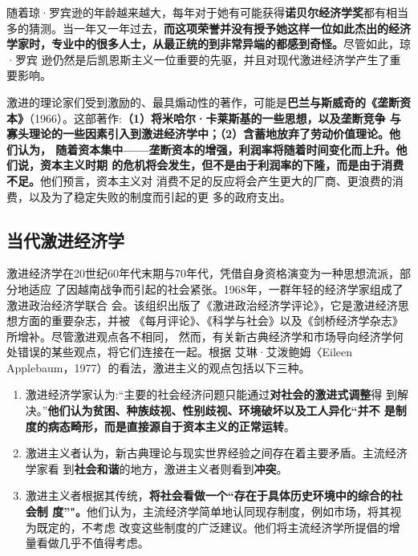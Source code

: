 随着琼·罗宾逊的年龄越来越大，每年对于她有可能获得\textbf{诺贝尔经济学奖}都有相当
多的猜测。当一年又一年过去，\textbf{而这项荣誉并没有授予她这样一位如此杰出的经济
  学家时，专业中的很多人士，从最正统的到非常异端的都感到奇怪。}尽管如此，琼·罗宾
逊仍然是后凯恩斯主义一位重要的先驱，并且对现代激进经济学产生了重要影响。

激进的理论家们受到激励的、最具煽动性的著作，可能是\textbf{巴兰与斯威奇的《垄断资
  本》}（1966）。这部著作:\textbf{（1）将米哈尔·卡莱斯基的一些思想，以及垄断竞争
  与寡头理论的一些因素引入到激进经济学中；（2）含蓄地放弃了劳动价值理论。他们认为，
  随着资本集中——垄断资本的增强，利润率将随着时间变化而上升。他们说，资本主义时期
  的危机将会发生，但不是由于利润率的下隆，而是由于消费不足。}他们预言，资本主义对
消费不足的反应将会产生更大的厂商、更浪费的消费，以及为了稳定失败的制度而引起的更
多的政府支出。

\subsection{当代激进经济学}

激进经济学在20世纪60年代末期与70年代，凭借自身资格演变为一种思想流派，部分地适应
了因越南战争而引起的社会紧张。1968年，一群年轻的经济学家组成了激进政治经济学联合
会。该组织出版了《激进政治经济学评论》，它是激进经济思想方面的重要杂志，并被
《每月评论》、《科学与社会》以及《剑桥经济学杂志》所增补。尽管激进观点各不相同，
然而，有关新古典经济学和市场导向经济学何处错误的某些观点，将它们连接在一起。根据
艾琳·艾泼鲍姆〈Eileen Applebaum，1977）的看法，激进主义的观点包括以下三种。

\begin{enumerate}[（1）]
\item 激进经济学家认为:“主要的社会经济问题只能通过\textbf{对社会的激进式调整}得
  到解决。”\textbf{他们认为贫困、种族歧视、性别歧视、环境破坏以及工人异化“并不
    是制度的病态畸形，而是直接源自于资本主义的正常运转}。

\item 激进主义者认为，新古典理论与现实世界经验之间存在着主要矛盾。主流经济学家看
  到\textbf{社会和谐}的地方，激进主义者则看到\textbf{冲突}。

\item 激进主义者根据其传统，\textbf{将社会看做一个“存在于具体历史环境中的综合的社会制
  度”"。}他们认为，主流经济学简单地认同现存制度，例如市场，将其视为既定的，不考虑
  改变这些制度的广泛建议。他们将主流经济学所提倡的增量看做几乎不值得考虑。
\end{enumerate}

